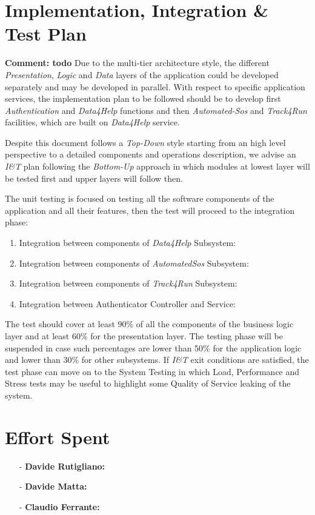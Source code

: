 \documentclass[a4paper]{article}
\newcommand{\comment}[1]{\textbf{Comment: #1}}
\begin{document}
\newpage
\section{Implementation, Integration \& Test Plan}
\comment{todo}
Due to the multi-tier architecture style, the different \textit{Presentation}, \textit{Logic} and \textit{Data} layers of the application could be developed separately and may be developed in parallel. With respect to specific application services, the implementation plan to be followed should be to develop first \textit{Authentication} and \textit{Data4Help} functions and then \textit{Automated-Sos} and \textit{Track4Run} facilities, which are built on \textit{Data4Help} service.

Despite this document follows a \textit{Top-Down} style starting from an high level perspective to a detailed components and operations description, we advise an \textit{I\&T} plan following the \textit{Bottom-Up} approach in which modules at lowest layer will be tested first and upper layers will follow then.

The unit testing is focused on testing all the software components of the application and all their features, then the test will proceed to the integration phase:

\begin{enumerate}
    \item Integration between components of \textit{Data4Help} Subsystem:

    \item Integration between components of \textit{AutomatedSos} Subsystem:

    \item Integration between components of \textit{Track4Run} Subsystem:
    
    \item Integration between Authenticator Controller and Service:

\end{enumerate}

The test should cover at least 90\% of all the components of the business logic layer and at least 60\% for the presentation layer. The testing phase will be suspended in case such percentages are lower than 50\% for the application logic and lower than 30\% for other subsystems. If \textit{I\&T} exit conditions are satisfied, the test phase can move on to the System Testing in which Load, Performance and Stress tests may be useful to highlight some Quality of Service leaking of the system.

\newpage
\section{Effort Spent}
    \begin{itemize}
        \item[-] \textbf{Davide Rutigliano: }
        
        \item[-] \textbf{Davide Matta: }
        
        \item[-] \textbf{Claudio Ferrante: }
    \end{itemize}
\end{document}
